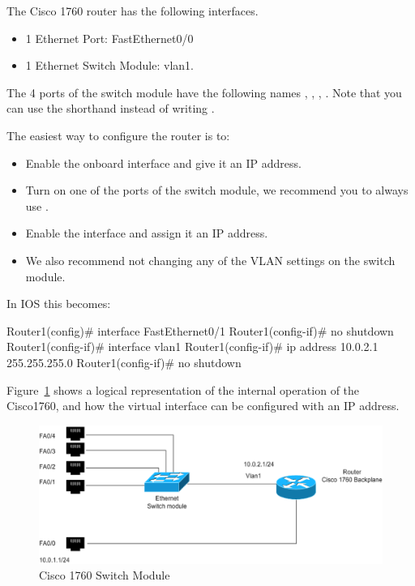 The Cisco 1760 router has the following interfaces.
\begin{itemize}
	\item 1 Ethernet Port: FastEthernet0/0
	\item 1 Ethernet Switch Module: vlan1.
\end{itemize}

The 4 ports of the switch module have the following names , , , . Note that you can use the shorthand  instead of writing .

The easiest way to configure the router is to:
\begin{itemize}
	\item Enable the onboard interface  and give it an IP address.
	\item Turn on one of the ports of the switch module, we recommend you to always use .
	\item Enable the  interface and assign it an IP address.
	\item We also recommend not changing any of the VLAN settings on the switch module.
\end{itemize}

In IOS this becomes:

\begin{cmdblock}
	Router1(config)# interface FastEthernet0/1
	Router1(config-if)# no shutdown
	Router1(config-if)# interface vlan1
	Router1(config-if)# ip address 10.0.2.1 255.255.255.0
	Router1(config-if)# no shutdown
\end{cmdblock}

Figure~\ref{fig:cisco-internal} shows a logical representation of the internal operation of the Cisco1760, and how the virtual interface  can be configured with an IP address.

\begin{figure}[h!t]
    \begin{center}  
      \includegraphics[width=\columnwidth]{graphics/cisco-internal.png} 
      \caption{Cisco 1760 Switch Module} \label{fig:cisco-internal}
    \end{center}
\end{figure}

